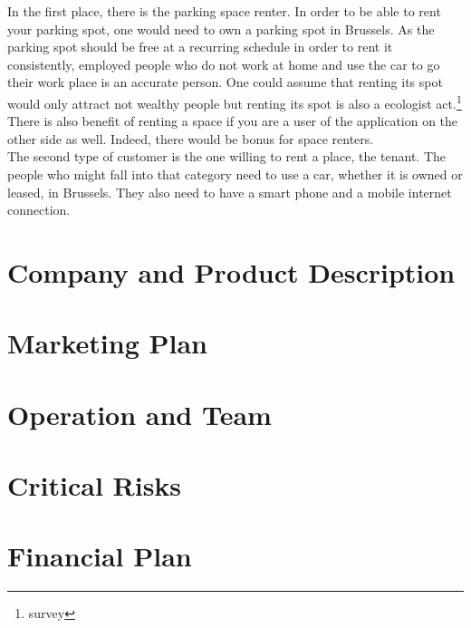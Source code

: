 \documentclass[12pt,a4paper,oneside]{book}
\begin{document}
In the first place, there is the parking space renter. In order to be able to rent your parking spot, one would need to own a parking spot in Brussels. As the parking spot should be free at a recurring schedule in order to rent it consistently, employed people who do not work at home and use the car to go their work place is an accurate person. One could assume that renting its spot would only attract not wealthy people but renting its spot is also a ecologist act.\footnote{survey} There is also benefit of renting a space if you are a user of the application on the other side as well. Indeed, there would be bonus for space renters.\\

The second type of customer is the one willing to rent a place, the tenant. The people who might fall into that category need to use a car, whether it is owned or leased, in Brussels. They also need to have a smart phone and a mobile internet connection.


\chapter{Company and Product Description}

\chapter{Marketing Plan}

\chapter{Operation and Team}

\chapter{Critical Risks}

\chapter{Financial Plan}



%

\end{document}
